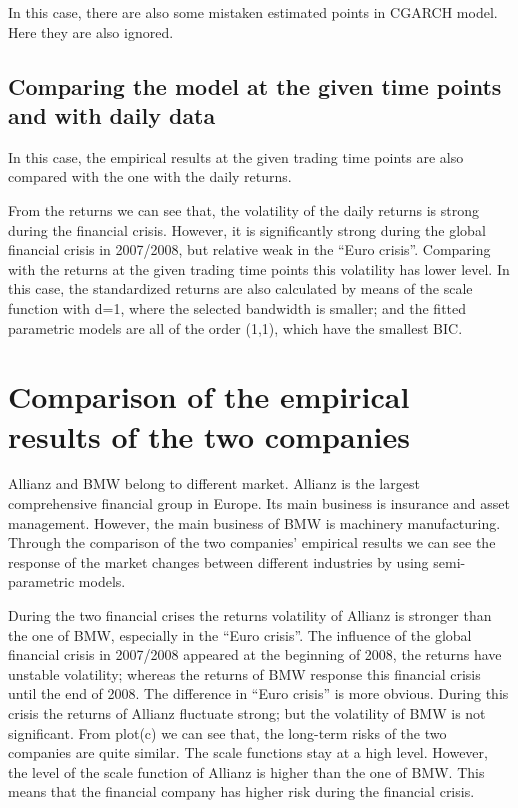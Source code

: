 In this case, there are also some mistaken estimated points in CGARCH model. Here they are also ignored.

\subsection{Comparing the model at the given time points and with daily data}

In this case, the empirical results at the given trading time points are also compared with the one with the daily returns.

From the returns we can see that, the volatility of the daily returns is strong during the financial crisis. However, it is significantly strong during the global financial crisis in 2007/2008, but relative weak in the ``Euro crisis''. Comparing with the returns at the given trading time points this volatility has lower level. In this case, the standardized returns are also calculated by means of the scale function with d=1, where the selected bandwidth is smaller; and the fitted parametric models are all of the order (1,1), which have the smallest BIC.

\section{Comparison of the empirical results of the two companies}

Allianz and BMW belong to different market. Allianz is the largest comprehensive financial group in Europe. Its main business is insurance and asset management. However, the main business of BMW is machinery manufacturing. Through the comparison of the two companies’ empirical results we can see the response of the market changes between different industries by using semi-parametric models.

During the two financial crises the returns volatility of Allianz is stronger than the one of BMW, especially in the ``Euro crisis''. The influence of the global financial crisis in 2007/2008 appeared at the beginning of 2008, the returns have unstable volatility; whereas the returns of BMW response this financial crisis until the end of 2008. The difference in ``Euro crisis'' is more obvious. During this crisis the returns of Allianz fluctuate strong; but the volatility of BMW is not significant. From plot(c) we can see that, the long-term risks of the two companies are quite similar. The scale functions stay at a high level. However, the level of the scale function of Allianz is higher than the one of BMW. This means that the financial company has higher risk during the financial crisis.

